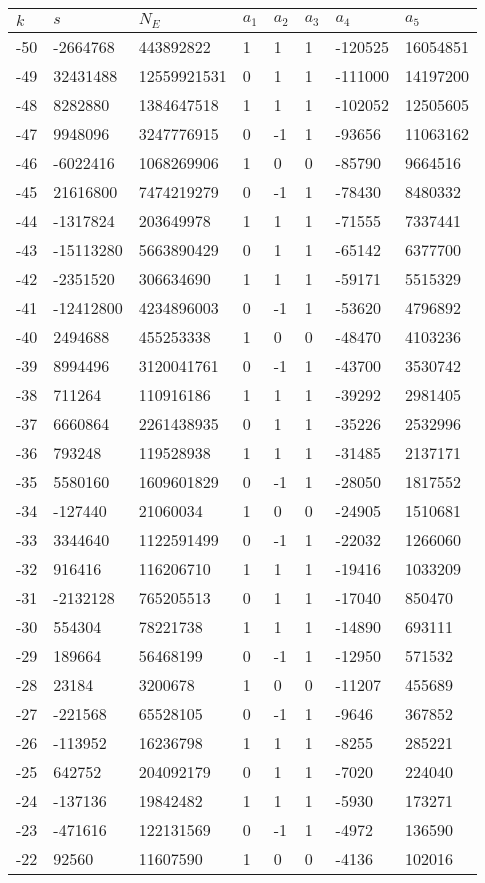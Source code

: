 \documentclass{amsart}
\begin{document}
\begin{longtable}{|l|l|l|lllll|}
\hline
$k$ & $s$ & $N_E$ & $a_1$ & $a_2$ & $a_3$ & $a_4$ & $a_5$\\
\hline
-50&-2664768&443892822&1&1&1&-120525&16054851\\
-49&32431488&12559921531&0&1&1&-111000&14197200\\
-48&8282880&1384647518&1&1&1&-102052&12505605\\
-47&9948096&3247776915&0&-1&1&-93656&11063162\\
-46&-6022416&1068269906&1&0&0&-85790&9664516\\
-45&21616800&7474219279&0&-1&1&-78430&8480332\\
-44&-1317824&203649978&1&1&1&-71555&7337441\\
-43&-15113280&5663890429&0&1&1&-65142&6377700\\
-42&-2351520&306634690&1&1&1&-59171&5515329\\
-41&-12412800&4234896003&0&-1&1&-53620&4796892\\
-40&2494688&455253338&1&0&0&-48470&4103236\\
-39&8994496&3120041761&0&-1&1&-43700&3530742\\
-38&711264&110916186&1&1&1&-39292&2981405\\
-37&6660864&2261438935&0&1&1&-35226&2532996\\
-36&793248&119528938&1&1&1&-31485&2137171\\
-35&5580160&1609601829&0&-1&1&-28050&1817552\\
-34&-127440&21060034&1&0&0&-24905&1510681\\
-33&3344640&1122591499&0&-1&1&-22032&1266060\\
-32&916416&116206710&1&1&1&-19416&1033209\\
-31&-2132128&765205513&0&1&1&-17040&850470\\
-30&554304&78221738&1&1&1&-14890&693111\\
-29&189664&56468199&0&-1&1&-12950&571532\\
-28&23184&3200678&1&0&0&-11207&455689\\
-27&-221568&65528105&0&-1&1&-9646&367852\\
-26&-113952&16236798&1&1&1&-8255&285221\\
-25&642752&204092179&0&1&1&-7020&224040\\
-24&-137136&19842482&1&1&1&-5930&173271\\
-23&-471616&122131569&0&-1&1&-4972&136590\\
-22&92560&11607590&1&0&0&-4136&102016\\

\end{longtable}
\end{document}

